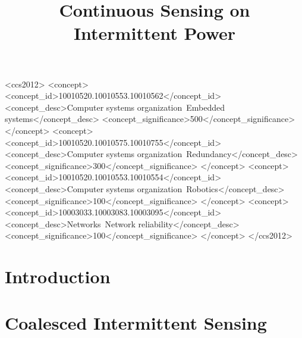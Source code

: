 \documentclass[sigconf]{acmart}
\begin{document}
\title{Continuous Sensing on Intermittent Power} 




\begin{abstract}

\end{abstract}
%
%
\begin{CCSXML}
<ccs2012>
 <concept>
  <concept_id>10010520.10010553.10010562</concept_id>
  <concept_desc>Computer systems organization~Embedded systems</concept_desc>
  <concept_significance>500</concept_significance>
 </concept>
 <concept>
  <concept_id>10010520.10010575.10010755</concept_id>
  <concept_desc>Computer systems organization~Redundancy</concept_desc>
  <concept_significance>300</concept_significance>
 </concept>
 <concept>
  <concept_id>10010520.10010553.10010554</concept_id>
  <concept_desc>Computer systems organization~Robotics</concept_desc>
  <concept_significance>100</concept_significance>
 </concept>
 <concept>
  <concept_id>10003033.10003083.10003095</concept_id>
  <concept_desc>Networks~Network reliability</concept_desc>
  <concept_significance>100</concept_significance>
 </concept>
</ccs2012>
\end{CCSXML}



\maketitle


\section{Introduction}
\label{sec:introduction}


%

\section{Coalesced Intermittent Sensing}
\label{sec:coalInterSen}

\end{document}
